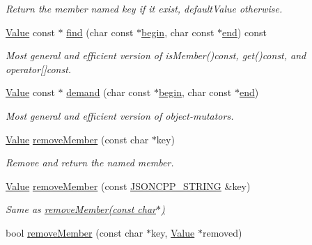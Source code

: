 \begin{DoxyCompactItemize}
\begin{DoxyCompactList}\small\item\em Return the member named key if it exist, default\+Value otherwise. \end{DoxyCompactList}\item 
\hyperlink{classJson_1_1Value}{Value} const $\ast$ \hyperlink{classJson_1_1Value_a184bf49ec5da7ec31af089cf6f458f99}{find} (char const $\ast$\hyperlink{classJson_1_1Value_ac12df0d6980600c5bac908ed0f64856e}{begin}, char const $\ast$\hyperlink{classJson_1_1Value_a596da1926b2f2a4056bff2edb713eb0b}{end}) const 
\begin{DoxyCompactList}\small\item\em Most general and efficient version of is\+Member()const, get()const, and operator\mbox{[}\mbox{]}const. \end{DoxyCompactList}\item 
\hyperlink{classJson_1_1Value}{Value} const $\ast$ \hyperlink{classJson_1_1Value_afeb7ff596a0929d90c5f2f3cffb413ed}{demand} (char const $\ast$\hyperlink{classJson_1_1Value_ac12df0d6980600c5bac908ed0f64856e}{begin}, char const $\ast$\hyperlink{classJson_1_1Value_a596da1926b2f2a4056bff2edb713eb0b}{end})
\begin{DoxyCompactList}\small\item\em Most general and efficient version of object-\/mutators. \end{DoxyCompactList}\item 
\hyperlink{classJson_1_1Value}{Value} \hyperlink{classJson_1_1Value_aa52f7873b95d29627d6e83ba96f69aaa}{remove\+Member} (const char $\ast$key)
\begin{DoxyCompactList}\small\item\em Remove and return the named member. \end{DoxyCompactList}\item 
\hyperlink{classJson_1_1Value}{Value} \hyperlink{classJson_1_1Value_a1dfd5d30fbc53fcd9c4955b8b3e7885c}{remove\+Member} (const \hyperlink{json_8hpp_a1e723f95759de062585bc4a8fd3fa4be}{J\+S\+O\+N\+C\+P\+P\+\_\+\+S\+T\+R\+I\+NG} \&key)
\begin{DoxyCompactList}\small\item\em Same as \hyperlink{classJson_1_1Value_aa52f7873b95d29627d6e83ba96f69aaa}{remove\+Member(const char$\ast$)} \end{DoxyCompactList}\item 
bool \hyperlink{classJson_1_1Value_a708e599489adf30d65bf85a8ee16e6fb}{remove\+Member} (const char $\ast$key, \hyperlink{classJson_1_1Value}{Value} $\ast$removed)

\end{DoxyCompactItemize}
